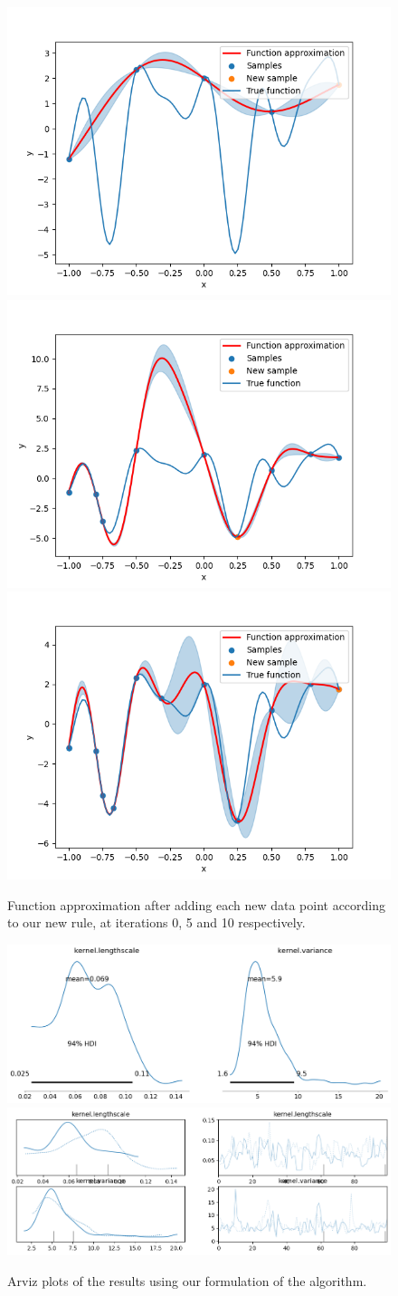 \begin{figure}[h]
\centering
\includegraphics[width=0.3\linewidth]{images/iter_0.png}
\includegraphics[width=0.3\linewidth]{images/iter_5.png}
\includegraphics[width=0.3\linewidth]{images/iter_9.png}
\setlength{\belowcaptionskip}{-10pt}
\caption{Function approximation after adding each new data point according to our new rule, at iterations 0, 5 and 10 respectively.}
\label{fig:iter_new}
\end{figure}




\begin{figure}[h]
\centering
\includegraphics[width=0.49\linewidth]{images/arviz_0.png}
\includegraphics[width=0.49\linewidth]{images/arviz_1.png}
\setlength{\belowcaptionskip}{-10pt}
\caption{Arviz plots of the results using our formulation of the algorithm.}
\label{fig:arviz_new}
\end{figure}
